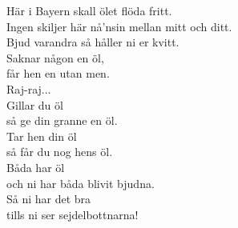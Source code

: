 \documentclass[a6paper,10pt]{article}
\begin{document}
\noindent
{}
\begin{center}
\end{center}
\begin{lyrics}
\small Här i Bayern skall ölet flöda fritt. \\
Ingen skiljer här nå'nsin mellan mitt och ditt. \\
Bjud varandra så håller ni er kvitt. \\
Saknar någon en öl, \\
får hen en utan men. \\
\newline
Raj-raj... \\
\newline
Gillar du öl \\
så ge din granne en öl. \\
Tar hen din öl \\
så får du nog hens öl. \\
Båda har öl \\
och ni har båda blivit bjudna. \\
Så ni har det bra \\
tills ni ser sejdelbottnarna! 
\end{lyrics}
\end{document}
